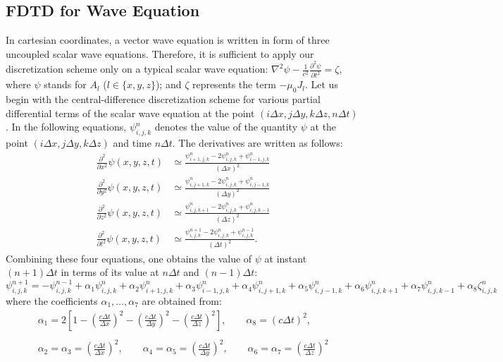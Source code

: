 \subsection{FDTD for Wave Equation}

In cartesian coordinates, a vector wave equation is written in form of three uncoupled scalar wave equations.
%
Therefore, it is sufficient to apply our discretization scheme only on a typical scalar wave equation: ${\nabla}^{2}\psi- \frac{1}{c^2} \frac{\partial^2 \psi}{ \partial t^2} = \zeta$, where $\psi$ stands for $A_l$ ($l \in \{x,y,z\}$); and $\zeta$ represents the term $-\mu_0 J_l$.
%
Let us begin with the central-difference discretization scheme for various partial differential terms of the scalar wave equation at the point $(i\Delta x,j\Delta y,k\Delta z,n\Delta t)$.
%
In the following equations, $\psi_{i,j,k}^n$ denotes the value of the quantity $\psi$ at the point $(i\Delta x,j\Delta y,k\Delta z)$ and time $n\Delta t$.
%
The derivatives are written as follows:
%
\begin{align}
\frac{\partial^{2}}{\partial x^{2}} \psi(x,y,z,t) & \simeq \frac{\psi_{i+1,j,k}^n-2\psi_{i,j,k}^n+\psi_{i-1,j,k}^n}{(\Delta x)^2}
\\
\frac{\partial^{2}}{\partial y^{2}} \psi(x,y,z,t) & \simeq \frac{\psi_{i,j+1,k}^n-2\psi_{i,j,k}^n+\psi_{i,j-1,k}^n}{(\Delta y)^2}
\\
\frac{\partial^{2}}{\partial z^{2}} \psi(x,y,z,t) & \simeq \frac{\psi_{i,j,k+1}^n-2\psi_{i,j,k}^n+\psi_{i,j,k-1}^n}{(\Delta z)^2}
\\
\frac{\partial^{2}}{\partial t^{2}} \psi(x,y,z,t) & \simeq \frac{\psi_{i,j,k}^{n+1}-2\psi_{i,j,k}^n+\psi_{i,j,k}^{n-1}}{(\Delta t)^2}.
\end{align}
%
Combining these four equations, one obtains the value of $\psi$ at instant $(n+1)\Delta t$ in terms of its value at $n\Delta t$ and $(n-1)\Delta t$:
%
\begin{equation}
\psi_{i,j,k}^{n+1} = -\psi_{i,j,k}^{n-1}+ \alpha_1 \psi_{i,j,k}^n + \alpha_2 \psi_{i+1,j,k}^n + \alpha_3 \psi_{i-1,j,k}^n + \alpha_4 \psi_{i,j+1,k}^n + \alpha_5 \psi_{i,j-1,k}^n + \alpha_6 \psi_{i,j,k+1}^n + \alpha_7 \psi_{i,j,k-1}^n + \alpha_8 \zeta_{i,j,k}^n \nonumber
\end{equation}
%
where the coefficients $\alpha_1, \ldots ,\alpha_7$ are obtained from:
%
\begin{equation}
\begin{array}{l}
\displaystyle
\alpha_1=2 \left[1-\left(\frac{c \Delta t}{\Delta x}\right)^2-\left(\frac{c \Delta t}{\Delta y}\right)^2-\left(\frac{c \Delta t}{\Delta z}\right)^2\right],
\qquad
\alpha_8=\left(c \Delta t\right)^2,
\\ \\ \displaystyle
\alpha_2=\alpha_3=\left(\frac{c \Delta t}{\Delta x}\right)^2,
\qquad
\alpha_4=\alpha_5=\left(\frac{c \Delta t}{\Delta y}\right)^2,
\qquad
\alpha_6=\alpha_7=\left(\frac{c \Delta t}{\Delta z}\right)^2
\end{array}
\end{equation}
